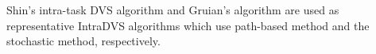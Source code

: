\documentclass[10pt,article]{IEEEtran}
\begin{document}
Shin's intra-task DVS algorithm \cite{shin-kim-lee} and Gruian's algorithm \cite{gruian} are used as representative IntraDVS algorithms which use path-based method and the stochastic method, respectively.



%
\end{document}
